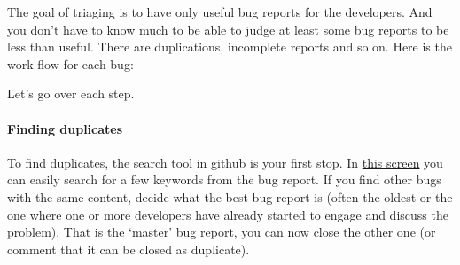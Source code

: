 \documentclass[letterpaper,10pt,english]{sphinxmanual}
\begin{document}
The goal of triaging is to have only useful bug reports for the developers. And you don't have to know much to be able to judge at least some bug reports to be less than useful. There are duplications, incomplete reports and so on. Here is the work flow for each bug:
\begin{figure}[htbp]
\centering

\end{figure}

Let's go over each step.


\paragraph{Finding duplicates}
\label{bugtracker/triaging:finding-duplicates}
To find duplicates, the search tool in github is your first stop. In \href{https://github.com/owncloud/core/issues}{this screen} you can easily search for a few keywords from the bug report. If you find other bugs with the same content, decide what the best bug report is (often the oldest or the one where one or more developers have already started to engage and discuss the problem). That is the `master' bug report, you can now close the other one (or comment that it can be closed as duplicate).
\end{document}
